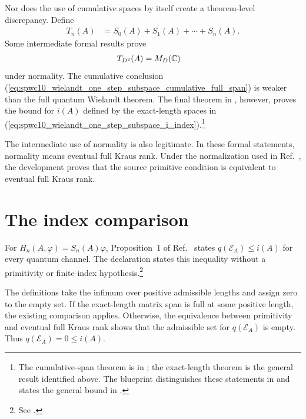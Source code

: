 \documentclass{article}
\begin{document}
Nor does the use of cumulative spaces by itself create a theorem-level
discrepancy. Define
\begin{align}
    T_n(A)
        &=
        S_0(A)+S_1(A)+\cdots+S_n(A).
    \label{eq:spwc10_wielandt_one_step_subspace_cumulative_span}
\end{align}
Some intermediate formal results prove
\begin{align}
    T_{D^2}(A)
        &=
        M_D(\mathbb{C})
    \label{eq:spwc10_wielandt_one_step_subspace_cumulative_full_span}
\end{align}
under normality. The cumulative conclusion
(\ref{eq:spwc10_wielandt_one_step_subspace_cumulative_full_span}) is weaker
than the full quantum Wielandt theorem. The final theorem in
, however, proves the bound for
$i(A)$ defined by the exact-length spaces in
(\ref{eq:spwc10_wielandt_one_step_subspace_i_index}).\footnote{The
    cumulative-span theorem is
     in
    ; the
    exact-length theorem is the general result identified above. The blueprint
    distinguishes these statements in
     and states the
    general bound in
    .}

The intermediate use of normality is also legitimate. In these formal
statements, normality means eventual full Kraus rank. Under the normalization
used in Ref.~\cite{Sanz2010Quantum}, the development proves that the source
primitive condition is equivalent to eventual full Kraus rank.

\section{The index comparison}

For $H_n(A,\varphi)=S_n(A)\varphi$, Proposition~1 of
Ref.~\cite{Sanz2010Quantum} states $q(\mathcal E_A)\le i(A)$ for every
quantum channel. The declaration
 states this inequality
without a primitivity or finite-index hypothesis.\footnote{See
    .}

The definitions take the infimum over positive admissible lengths and assign
zero to the empty set. If the exact-length matrix span is full at some
positive length, the existing comparison applies. Otherwise, the equivalence
between primitivity and eventual full Kraus rank shows that the admissible
set for $q(\mathcal E_A)$ is empty. Thus $q(\mathcal E_A)=0\le i(A)$.
\end{document}
